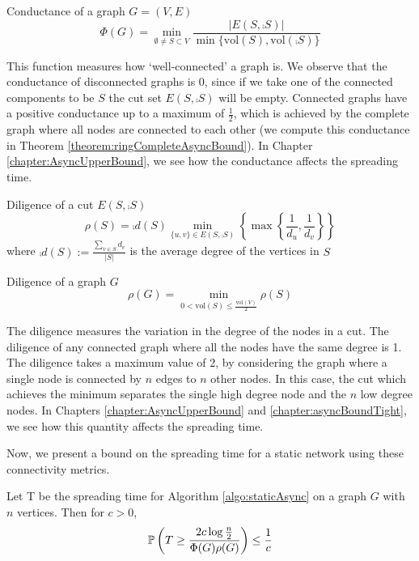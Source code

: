 \begin{definition}
	Conductance of a graph $G = (V, E)$
	$$
		\Phi(G) = \min_{\emptyset \neq S \subset V} \frac{|E(S, \comp{S})|}{\min\{\text{vol}(S), \text{vol}(\comp{S})\}}
	$$
\end{definition}

This function measures how `well-connected' a graph is. We observe that the conductance of disconnected graphs is 0, since if we take one of the connected components to be $S$ the cut set $E(S, \comp{S})$ will be empty. Connected graphs have a positive conductance up to a maximum of $\frac{1}{2}$, which is achieved by the complete graph where all nodes are connected to each other (we compute this conductance in Theorem \ref{theorem:ringCompleteAsyncBound}). In Chapter \ref{chapter:AsyncUpperBound}, we see how the conductance affects the spreading time. 

\begin{definition}
	Diligence of a cut $ E(S, \comp{S}) $
	$$
		\rho(S) = \comp{d}(S) \min_{\{u, v\} \in E(S, \comp{S}) } \left\{ \max \left\{ \frac{1}{d_u},\frac{1}{d_v} \right\} \right\}
	$$ 
	where $\comp{d}(S) := \frac{\sum_{v \in S} d_v}{|S|}$ is the average degree of the vertices in $S$
\end{definition}

\begin{definition}
	Diligence of a graph $G$
	$$
		\rho(G) = \min_{0 < \text{vol}(S) \leq \frac{\text{vol}(V)}{2}} \rho(S) 
	$$
\end{definition}

The diligence measures the variation in the degree of the nodes in a cut. The diligence of any connected graph where all the nodes have the same degree is 1. The diligence takes a maximum value of 2, by considering the graph where a single node is connected by $n$ edges to $n$ other nodes. In this case, the cut which achieves the minimum separates the single high degree node and the $n$ low degree nodes. In Chapters \ref{chapter:AsyncUpperBound} and \ref{chapter:asyncBoundTight}, we see how this quantity affects the spreading time. 

Now, we present a bound on the spreading time for a static network using these connectivity metrics.

\begin{theorem}\label{theorem:staticBound}
	Let T be the spreading time for Algorithm \ref{algo:staticAsync} on a graph $G$ with $n$ vertices. Then for $c > 0$,
	$$
		\mathbb{P}\left( T \geq \frac{2c \log \frac{n}{2}}{\Phi(G)\rho(G)}\right) \leq \frac{1}{c}
	$$
\end{theorem}

